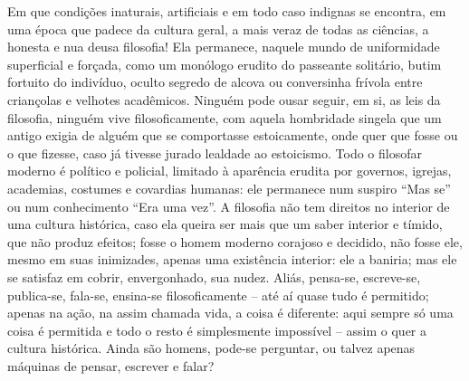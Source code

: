 Em que condições inaturais, artificiais e em todo caso indignas se
encontra, em uma época que padece da cultura geral, a mais veraz de
todas as ciências, a honesta e nua deusa filosofia! Ela permanece,
naquele mundo de uniformidade superficial e forçada, como um monólogo
erudito do passeante solitário, butim fortuito do indivíduo, oculto
segredo de alcova ou conversinha frívola entre criançolas e velhotes
acadêmicos. Ninguém pode ousar seguir, em si, as leis da filosofia,
ninguém vive filosoficamente, com aquela hombridade singela que um
antigo exigia de alguém que se comportasse estoicamente, onde quer que
fosse ou o que fizesse, caso já tivesse jurado lealdade ao estoicismo.
Todo o filosofar moderno é político e policial, limitado à aparência
erudita por governos, igrejas, academias, costumes e covardias humanas:
ele permanece num suspiro ``Mas se'' ou num conhecimento ``Era uma
vez''. A filosofia não tem direitos no interior de uma cultura
histórica, caso ela queira ser mais que um saber interior e tímido, que
não produz efeitos; fosse o homem moderno corajoso e decidido, não fosse
ele, mesmo em suas inimizades, apenas uma existência interior: ele a
baniria; mas ele se satisfaz em cobrir, envergonhado, sua nudez. Aliás,
pensa-se, escreve-se, publica-se, fala-se, ensina-se filosoficamente --
até aí quase tudo é permitido; apenas na ação, na assim chamada vida, a
coisa é diferente: aqui sempre só uma coisa é permitida e todo o resto é
simplesmente impossível -- assim o quer a cultura histórica. Ainda são
homens, pode-se perguntar, ou talvez apenas máquinas de pensar, escrever
e falar?

